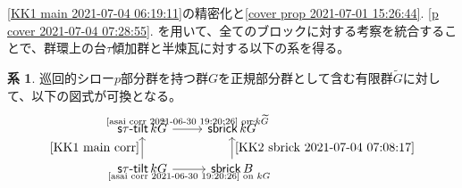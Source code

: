 \documentclass[a4paper,uplatex,dvipdfmx]{jsarticle}
\theoremstyle{definition}
\newtheorem{corollary}[theorem]{系}
\newcommand{\stautilt}{\operatorname{\mathsf{s\tau-tilt}}}
\newcommand{\sbrick}{\operatorname{\mathsf{sbrick}}}
\begin{document}
\cref{KK1 main 2021-07-04 06:19:11}の精密化と\cref{cover prop 2021-07-01 15:26:44}. \cref{p cover 2021-07-04 07:28:55}. を用いて、全てのブロックに対する考察を統合することで、群環上の台\(\tau\)傾加群と半煉瓦に対する以下の系を得る。
\begin{corollary}
  巡回的シロー\(p\)部分群を持つ群\(G\)を正規部分群として含む有限群\(\widetilde{G}\)に対して、以下の図式が可換となる。
  \begin{equation}
    \begin{tikzcd}
      \stautilt k\widetilde{G}\ar[r,"\text{\cref{asai corr 2021-06-30 19:20:26} on \(k\widetilde{G}\)}"]&\sbrick k\widetilde{G}\\
      \stautilt kG\ar[u,"\cref{KK1 main corr}"]\ar[r,"\text{\cref{asai corr 2021-06-30 19:20:26} on \(kG\)}"']&\sbrick B\ar[u,"\cref{KK2 sbrick 2021-07-04 07:08:17}"']
    \end{tikzcd}
  \end{equation}
\end{corollary}




% 

\end{document}
